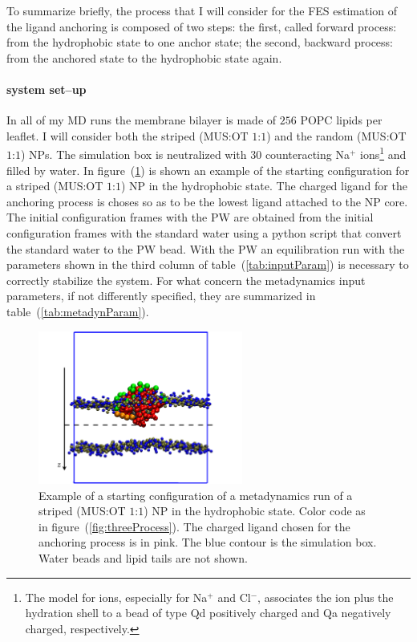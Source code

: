 To summarize briefly, the process that I will consider for the \ac{FES} estimation of the ligand anchoring is composed of two steps: the first, called forward process: from the hydrophobic state to one anchor state; the second, backward process: from the anchored state to the hydrophobic state again. 

\paragraph{\textbf{system set--up}} In all of my \ac{MD} runs the membrane bilayer is made of $256$ \ac{POPC} lipids per leaflet. I will consider both the striped (\ac{MUS}:\ac{OT} $1$:$1$) and the random (\ac{MUS}:\ac{OT} $1$:$1$) \acp{NP}. The simulation box is neutralized with $30$ counteracting Na$^+$ ions\footnote{The \martini model for ions, especially for Na$^+$ and Cl$^-$, associates the ion plus the hydration shell to a bead of type Qd positively charged and Qa negatively charged, respectively.} and filled by water. In figure~(\ref{fig:startFrameEx}) is shown an example of the starting configuration for a striped (\ac{MUS}:\ac{OT} $1$:$1$) \ac{NP} in the hydrophobic state. The charged ligand for the anchoring process is choses so as to be the lowest ligand attached to the \ac{NP} core. The initial configuration frames with the \ac{PW} are obtained from the initial configuration frames with the standard \martini water using a python script that convert the standard \martini water to the \ac{PW} bead. With the \ac{PW} an equilibration run with the parameters shown in the third column of table~(\ref{tab:inputParam}) is necessary to correctly stabilize the system. For what concern the metadynamics input parameters, if not differently specified, they are summarized in table~(\ref{tab:metadynParam}).
\begin{figure}
	\centering
	\includegraphics[width=0.6\textwidth]{./img/patchedHydrophobic}
	\caption{Example of a starting configuration of a metadynamics run of a striped (\ac{MUS}:\ac{OT} $1$:$1$) \ac{NP} in the hydrophobic state. Color code as in figure~(\ref{fig:threeProcess}). The charged ligand chosen for the anchoring process is in pink. The blue contour is the simulation box. Water beads and lipid tails are not shown.}
	\label{fig:startFrameEx}
\end{figure}

